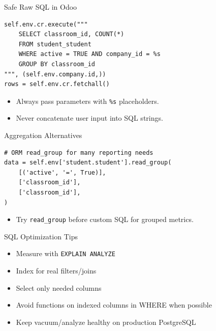 \begin{frame}[fragile]{Safe Raw SQL in Odoo}
\begin{lstlisting}
self.env.cr.execute("""
	SELECT classroom_id, COUNT(*)
	FROM student_student
	WHERE active = TRUE AND company_id = %s
	GROUP BY classroom_id
""", (self.env.company.id,))
rows = self.env.cr.fetchall()
\end{lstlisting}
	\begin{itemize}
		\item Always pass parameters with \texttt{\%s} placeholders.
		\item Never concatenate user input into SQL strings.
	\end{itemize}
\end{frame}

\begin{frame}[fragile]{Aggregation Alternatives}
\begin{lstlisting}
# ORM read_group for many reporting needs
data = self.env['student.student'].read_group(
	[('active', '=', True)],
	['classroom_id'],
	['classroom_id'],
)
\end{lstlisting}
	\begin{itemize}
		\item Try \texttt{read\_group} before custom SQL for grouped metrics.
	\end{itemize}
\end{frame}

\begin{frame}{SQL Optimization Tips}
	\begin{itemize}
		\item Measure with \texttt{EXPLAIN ANALYZE}
		\item Index for real filters/joins
		\item Select only needed columns
		\item Avoid functions on indexed columns in WHERE when possible
		\item Keep vacuum/analyze healthy on production PostgreSQL
	\end{itemize}
\end{frame}
